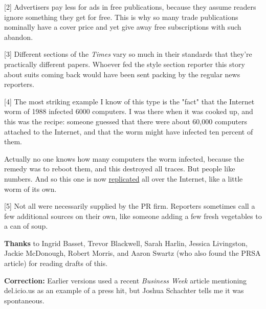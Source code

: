 [2] Advertisers pay less for ads in free publications, because
                  they assume readers ignore something they get for free. This
                  is why so many trade publications nominally have a cover price
                  and yet give away free subscriptions with such abandon.

[3] Different sections of the \emph{Times} vary so much in
                  their standards that they're practically different papers.
                  Whoever fed the style section reporter this story about suits
                  coming back would have been sent packing by the regular news
                  reporters.

[4] The most striking example I know of this type is the "fact"
                  that the Internet worm of 1988 infected 6000 computers. I was
                  there when it was cooked up, and this was the recipe: someone
                  guessed that there were about 60,000 computers attached to the
                  Internet, and that the worm might have infected ten percent of
                  them.

Actually no one knows how many computers the
                  worm infected, because the remedy was to reboot them, and this
                  destroyed all traces. But people like numbers. And so this one
                  is now
                  \href{http://www.google.com/search?q=internet+worm+1988+6000}{replicated}
                  all over the Internet, like a little worm of its own.

[5] Not all were necessarily supplied by the PR firm. Reporters
                  sometimes call a few additional sources on their own, like
                  someone adding a few fresh vegetables to a can of soup.


                  \textbf{Thanks} to Ingrid Basset, Trevor Blackwell, Sarah
                  Harlin, Jessica Livingston, Jackie McDonough, Robert Morris,
                  and Aaron Swartz (who also found the PRSA article) for reading
                  drafts of this.

\textbf{Correction:} Earlier versions
                  used a recent \emph{Business Week} article mentioning
                  del.icio.us as an example of a press hit, but Joshua Schachter
                  tells me it was spontaneous.


              
            
          

            
              
